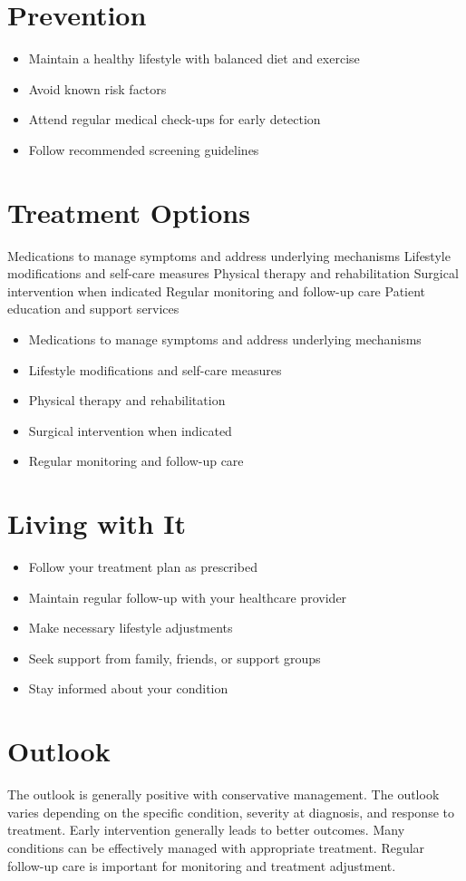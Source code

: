 \section{Prevention}
\begin{itemize}[noitemsep]
  \item Maintain a healthy lifestyle with balanced diet and exercise
  \item Avoid known risk factors
  \item Attend regular medical check-ups for early detection
  \item Follow recommended screening guidelines
\end{itemize}
\section{Treatment Options}
Medications to manage symptoms and address underlying mechanisms Lifestyle modifications and self-care measures Physical therapy and rehabilitation Surgical intervention when indicated Regular monitoring and follow-up care Patient education and support services

\begin{itemize}[noitemsep]
  \item Medications to manage symptoms and address underlying mechanisms
  \item Lifestyle modifications and self-care measures
  \item Physical therapy and rehabilitation
  \item Surgical intervention when indicated
  \item Regular monitoring and follow-up care
\end{itemize}
\section{Living with It}
\begin{itemize}[noitemsep]
  \item Follow your treatment plan as prescribed
  \item Maintain regular follow-up with your healthcare provider
  \item Make necessary lifestyle adjustments
  \item Seek support from family, friends, or support groups
  \item Stay informed about your condition
\end{itemize}
\section{Outlook}
The outlook is generally positive with conservative management. The outlook varies depending on the specific condition, severity at diagnosis, and response to treatment. Early intervention generally leads to better outcomes. Many conditions can be effectively managed with appropriate treatment. Regular follow-up care is important for monitoring and treatment adjustment.
